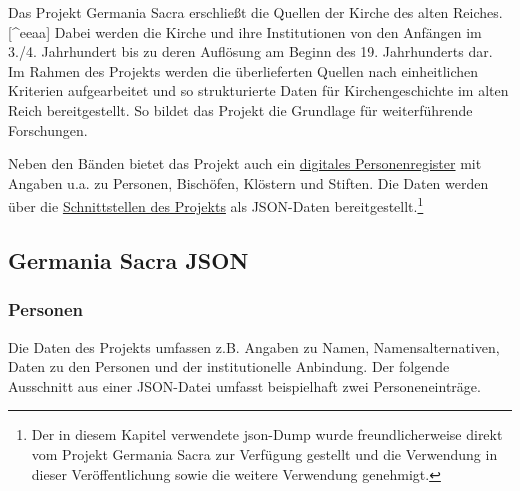 Das Projekt Germania Sacra erschließt die Quellen der Kirche des alten
Reiches.{[}\^{}eeaa{]} Dabei werden die Kirche und ihre Institutionen
von den Anfängen im 3./4. Jahrhundert bis zu deren Auflösung am Beginn
des 19. Jahrhunderts dar. Im Rahmen des Projekts werden die
überlieferten Quellen nach einheitlichen Kriterien aufgearbeitet und so
strukturierte Daten für Kirchengeschichte im alten Reich bereitgestellt.
So bildet das Projekt die Grundlage für weiterführende Forschungen.

Neben den Bänden bietet das Projekt auch ein
\href{https://adw-goe.de/forschung/forschungsprojekte-akademienprogramm/germania-sacra/digitales-personenregister/}{digitales
Personenregister} mit Angaben u.a. zu Personen, Bischöfen, Klöstern und
Stiften. Die Daten werden über die
\href{https://adw-goe.de/forschung/forschungsprojekte-akademienprogramm/germania-sacra/schnittstellen-und-linked-data/}{Schnittstellen
des Projekts} als JSON-Daten bereitgestellt.\footnote{Der in diesem
  Kapitel verwendete json-Dump wurde freundlicherweise direkt vom
  Projekt Germania Sacra zur Verfügung gestellt und die Verwendung in
  dieser Veröffentlichung sowie die weitere Verwendung genehmigt.}

\hypertarget{germania-sacra-json}{%
\subsection{Germania Sacra JSON}\label{germania-sacra-json}}

\hypertarget{personen}{%
\subsubsection{Personen}\label{personen}}

Die Daten des Projekts umfassen z.B. Angaben zu Namen,
Namensalternativen, Daten zu den Personen und der institutionelle
Anbindung. Der folgende Ausschnitt aus einer JSON-Datei umfasst
beispielhaft zwei Personeneinträge.

